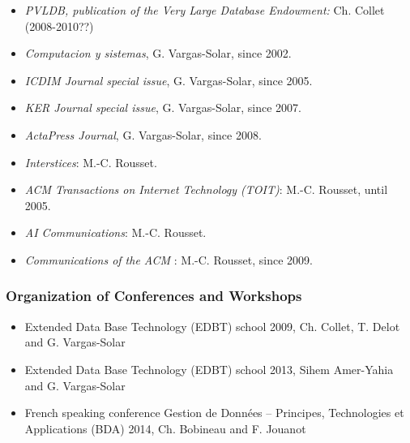 \begin{itemize}
\setlength{\itemindent}{-0.5cm}
\setlength{\itemsep}{-0.1cm}
\item {\it PVLDB, publication of the Very Large Database Endowment:} Ch. Collet (2008-2010??)

\item {\it Computacion y sistemas}, G. Vargas-Solar, since 2002.

\item {\it ICDIM Journal special issue}, G. Vargas-Solar, since 2005.

\item {\it KER Journal special issue}, G. Vargas-Solar, since 2007.

\item {\it ActaPress Journal}, G. Vargas-Solar, since 2008.

\item {\it Interstices}: M.-C. Rousset.

\item {\it ACM Transactions on Internet Technology (TOIT)}: M.-C. Rousset,  until 2005.

\item {\it AI Communications}: M.-C. Rousset.

\item {\it Communications of the ACM }: M.-C. Rousset,  since 2009.


\end{itemize}

\subsubsection*{Organization of Conferences and Workshops}

\begin{itemize}
\setlength{\itemindent}{-0.5cm}
\setlength{\itemsep}{-0.1cm}
\item Extended Data Base Technology (EDBT) school 2009, Ch. Collet, T. Delot and G. Vargas-Solar

\item Extended Data Base Technology (EDBT) school 2013, Sihem Amer-Yahia and G. Vargas-Solar

\item French speaking conference Gestion de Donn\'ees – Principes, Technologies et Applications (BDA) 2014, Ch. Bobineau and F. Jouanot

\end{itemize}

